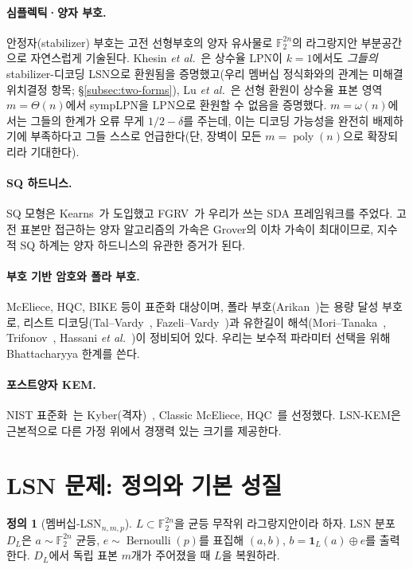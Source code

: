 \documentclass[11pt,a4paper]{article}
\theoremstyle{plain}
\theoremstyle{definition}
\newtheorem{definition}[theorem]{정의}
\newcommand{\F}{\mathbb{F}}
\newcommand{\etal}{\textit{et al.}}
\begin{document}
\paragraph{심플렉틱·양자 부호.} 안정자(stabilizer) 부호는 고전 선형부호의 양자 유사물로 $\F_2^{2n}$의 라그랑지안 부분공간으로 자연스럽게 기술된다. Khesin \etal~\cite{KLP+25}은 상수율 LPN이 $k=1$에서도 \emph{그들의} stabilizer-디코딩 LSN으로 환원됨을 증명했고(우리 멤버십 정식화와의 관계는 미해결 위치결정 항목; \S\ref{subsec:two-forms}), Lu \etal~\cite{LPQR26}은 선형 환원이 상수율 표본 영역 $m=\Theta(n)$에서 sympLPN을 LPN으로 환원할 수 없음을 증명했다. $m=\omega(n)$에서는 그들의 한계가 오류 무게 $1/2-\delta$를 주는데, 이는 디코딩 가능성을 완전히 배제하기에 부족하다고 그들 스스로 언급한다(단, 장벽이 모든 $m=\operatorname{poly}(n)$으로 확장되리라 기대한다).

\paragraph{SQ 하드니스.} SQ 모형은 Kearns~\cite{Kea98}가 도입했고 FGRV~\cite{FGR+17}가 우리가 쓰는 SDA 프레임워크를 주었다. 고전 표본만 접근하는 양자 알고리즘의 가속은 Grover의 이차 가속이 최대이므로, 지수적 SQ 하계는 양자 하드니스의 유관한 증거가 된다.

\paragraph{부호 기반 암호와 폴라 부호.} McEliece, HQC, BIKE 등이 표준화 대상이며, 폴라 부호(Arikan~\cite{Ari09})는 용량 달성 부호로, 리스트 디코딩(Tal--Vardy~\cite{TV15}, Fazeli--Vardy~\cite{FV19})과 유한길이 해석(Mori--Tanaka~\cite{MT09}, Trifonov~\cite{Tri12}, Hassani \etal~\cite{HVU14})이 정비되어 있다. 우리는 보수적 파라미터 선택을 위해 Bhattacharyya 한계를 쓴다.

\paragraph{포스트양자 KEM.} NIST 표준화~\cite{NIS22}는 Kyber(격자)~\cite{SAB+22}, Classic McEliece, HQC~\cite{AAC+22}를 선정했다. LSN-KEM은 근본적으로 다른 가정 위에서 경쟁력 있는 크기를 제공한다.


\section{LSN 문제: 정의와 기본 성질}

\begin{definition}[멤버십-LSN$_{n,m,p}$]
\label{def:lsn}
$L \subset \F_2^{2n}$을 균등 무작위 라그랑지안이라 하자. LSN 분포 $D_L$은 $a \sim \F_2^{2n}$ 균등, $e \sim \operatorname{Bernoulli}(p)$를 표집해 $(a, b)$, $b = \mathbf{1}_L(a) \oplus e$를 출력한다. $D_L$에서 독립 표본 $m$개가 주어졌을 때 $L$을 복원하라.
\end{definition}
\end{document}
